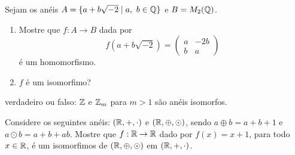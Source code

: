 \documentclass[12pt]{article}
\begin{document}
\vesp

\questao Sejam os an{\'e}is $A = \{ a + b\sqrt{-2} \mid a,\ b \in \mathbb{Q}\}$ e $B = M_2(\mathbb{Q})$.
\begin{enumerate}[label=({\alph*})]
\item Mostre que $f : A \to B$ dada por
\[
f(a + b\sqrt{-2}) =
\begin{pmatrix}
a & -2b\\
b & a
\end{pmatrix}
\]
{\'e} um homomorfismo.
\item $f$ {\'e} um isomorfimo?
\end{enumerate}

 verdadeiro ou falso: $\mathbb{Z}$ e $\mathbb{Z}_{m}$ para $m > 1$ s{\~a}o an{\'e}is
isomorfos.

\vesp

\questao Considere os seguintes an{\'e}is: $(\mathbb{R}, +, \cdot)$ e $(\mathbb{R}, \oplus, \odot)$, sendo $a \oplus b = a + b + 1$ e $a \odot b = a + b + ab$. Mostre que $f : \mathbb{R} \to \mathbb{R}$ dado por $f(x) = x + 1$, para todo $x \in \mathbb{R}$, {\'e} um isomorfimos de $(\mathbb{R}, \oplus, \odot)$ em $(\mathbb{R}, +, \cdot)$.
\end{document}
